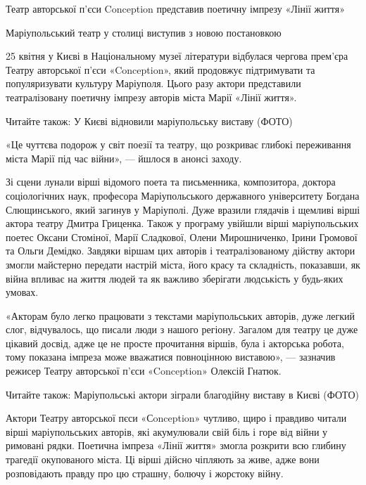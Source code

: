  
 
 
 
 

Театр авторської п'єси Conception представив поетичну імпрезу «Лінії життя»

Маріупольський театр у столиці виступив з новою постановкою

25 квітня у Києві в Національному музеї літератури відбулася чергова прем'єра
Театру авторської п'єси «Conception», який продовжує підтримувати та
популяризувати культуру Маріуполя. Цього разу актори представили театралізовану
поетичну імпрезу авторів міста Марії «Лінії життя».

Читайте також: У Києві відновили маріупольську виставу (ФОТО)

«Це чуттєва подорож у світ поезії та театру, що розкриває глибокі переживання
міста Марії під час війни», — йшлося в анонсі заходу.

Зі сцени лунали вірші відомого поета та письменника, композитора, доктора
соціологічних наук, професора Маріупольського державного університету Богдана
Слющинського, який загинув у Маріуполі. Дуже вразили глядачів і щемливі вірші
актора театру Дмитра Гриценка. Також у програму увійшли вірші маріупольських
поетес Оксани Стоміної, Марії Сладкової, Олени Мирошниченко, Ірини Громової та
Ольги Демідко. Завдяки віршам цих авторів і театралізованому дійству актори
змогли майстерно передати настрій міста, його красу та складність, показавши,
як війна впливає на життя людей та як важливо зберігати людськість у будь-яких
умовах.

«Акторам було легко працювати з текстами маріупольських авторів, дуже легкий
слог, відчувалось, що писали люди з нашого регіону. Загалом для театру це дуже
цікавий досвід, адже це не просте прочитання віршів, була і акторська робота,
тому показана імпреза може вважатися повноцінною виставою», — зазначив режисер
Театру авторської п'єси «Conception» Олексій Гнатюк.

Читайте також: Маріупольські актори зіграли благодійну виставу в Києві (ФОТО)

Актори Театру авторської пєси «Сonception» чутливо, щиро і правдиво читали
вірші маріупольських авторів, які акумулювали свій біль і горе від війни у
римовані рядки. Поетична імпреза «Лінії життя» змогла розкрити всю глибину
трагедії окупованого міста. Ці вірші дійсно чіпляють за живе, адже вони
розповідають правду про цю страшну, болючу і жорстоку війну.

